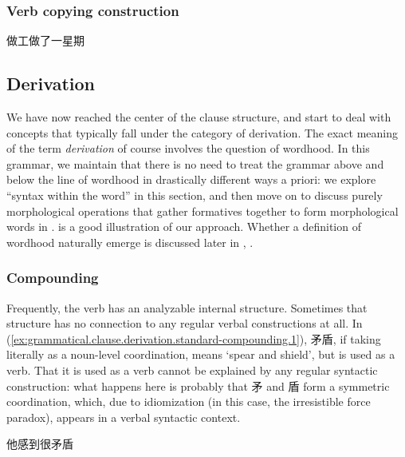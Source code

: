 \documentclass[UTF8, a4paper, oneside, scheme=plain, 12pt]{ctexrep}
\newcommand*{\term}[1]{\emph{#1}}
\newcommand{\translate}[1]{`#1'}
\begin{document}
\subsubsection{Verb copying construction}

\begin{exe}
    \ex 做工做了一星期
\end{exe}

\subsection{Derivation}\label{sec:grammatical.clause.core-vp.derivation}

We have now reached the center of the clause structure,
and start to deal with concepts that typically fall under the category of derivation.
The exact meaning of the term \term{derivation} of course involves the question of wordhood.
In this grammar, we maintain that there is no need to treat the grammar above and below the line of wordhood
in drastically different ways a priori: we explore ``syntax within the word'' in this section,
and then move on to discuss purely morphological operations that gather formatives together to form morphological words in .
 is a good illustration of our approach.
Whether a definition of wordhood naturally emerge is discussed later in
, .

\subsubsection{Compounding}\label{sec:grammatical.clause.core-vp.derivation.compounding}

Frequently, the verb has an analyzable internal structure.
Sometimes that structure has no connection to any regular verbal constructions at all.
In (\ref{ex:grammatical.clause.derivation.standard-compounding.1}),
矛盾, if taking literally as a noun-level coordination, means \translate{spear and shield},
but is used as a verb.
That it is used as a verb cannot be explained by any regular syntactic construction:
what happens here is probably that 矛 and 盾 form a symmetric coordination,
which, due to idiomization (in this case, the irresistible force paradox),
appears in a verbal syntactic context.

\begin{exe}
    \ex\label{ex:grammatical.clause.derivation.standard-compounding.1} 他感到很矛盾
\end{exe}
\end{document}
